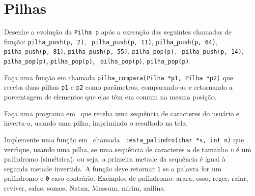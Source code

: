 \section*{Pilhas}

\exercise Desenhe a evolução da {\tt Pilha p} após a execução das
seguintes chamadas de função: {\tt pilha\_push(p, 2)}, {\tt
  pilha\_push(p, 11)}, {\tt pilha\_push(p, 64)}, {\tt pilha\_push(p,
  81)}, {\tt pilha\_push(p, 55)}, {\tt pilha\_pop(p)}, {\tt
  pilha\_push(p, 14)}, {\tt pilha\_pop(p)}, {\tt pilha\_pop(p)}, {\tt
  pilha\_pop(p)}, {\tt pilha\_pop(p)}.

\exercise Faça uma função em \CEE{} chamada {\tt pilha\_compara(Pilha
  *p1, Pilha *p2)} que receba duas pilhas {\tt p1} e {\tt p2} como
parâmetros, comparando-as e retornando a porcentagem de elementos que
elas têm em comum na mesma posição.

\exercise Faça uma programa em \CEE\ que receba uma sequência de
caracteres do usuário e inverta-a, usando uma pilha, imprimindo o
resultado na tela.

\exercise Implemente uma função em \CEE\ chamada {\tt
  testa\_palindro(char *s, int n)} que verifique, usando uma pilha, se
uma sequência de caracteres {\tt s} de tamanho {\tt n} é um palíndromo
(simétrica), ou seja, a primeira metade da sequência é igual à segunda
metade invertida. A função deve retornar {\tt 1} se a palavra for um
palíndromo e {\tt 0} caso contrário. Exemplos de palíndromo: arara,
osso, reger, ralar, reviver, salas, somos, Natan, Mussum, mirim,
anilina.

